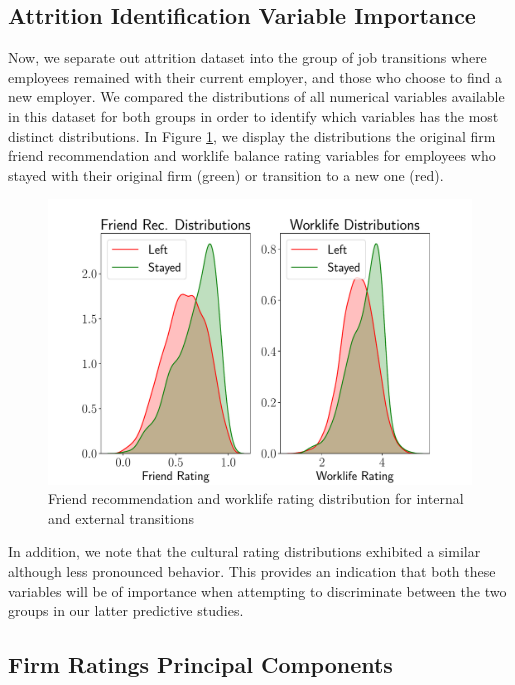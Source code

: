 \documentclass[10pt]{article}
\begin{document}
\subsection{Attrition Identification Variable Importance}

Now, we separate out attrition dataset into the group of job transitions 
where employees remained with their current employer, and those who 
choose to find a new employer. We compared the distributions of all 
numerical variables available in this dataset for both groups 
in order to identify which variables has the most distinct 
distributions.  In Figure \ref{fig:discdist}, we display the 
distributions the original firm friend recommendation and 
worklife balance rating variables for employees who 
stayed with their original firm (green) or transition to a new one (red). 
%
\begin{figure}[thb]
    \centering
	\includegraphics[width=1.0\linewidth]{discdist.pdf}
	\caption{Friend recommendation and worklife rating distribution for internal 
    and external transitions}
	\label{fig:discdist}
\end{figure}
%
In addition, we note that the cultural rating distributions exhibited a similar 
although less pronounced behavior.  This provides an indication that both 
these variables will be of importance when attempting to discriminate between 
the two groups in our latter predictive studies. 

\subsection{Firm Ratings Principal Components}
\end{document}
